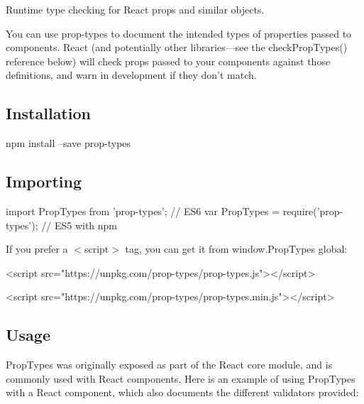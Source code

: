Runtime type checking for React props and similar objects.

You can use prop-\/types to document the intended types of properties passed to components. React (and potentially other libraries—see the check\+Prop\+Types() reference below) will check props passed to your components against those definitions, and warn in development if they don’t match.

\subsection*{Installation}


\begin{DoxyCode}
npm install --save prop-types
\end{DoxyCode}


\subsection*{Importing}


\begin{DoxyCode}
import PropTypes from 'prop-types'; // ES6
var PropTypes = require('prop-types'); // ES5 with npm
\end{DoxyCode}


If you prefer a {\ttfamily $<$script$>$} tag, you can get it from {\ttfamily window.\+Prop\+Types} global\+:


\begin{DoxyCode}
<script src="https://unpkg.com/prop-types/prop-types.js"></script>


<script src="https://unpkg.com/prop-types/prop-types.min.js"></script>
\end{DoxyCode}


\subsection*{Usage}

Prop\+Types was originally exposed as part of the React core module, and is commonly used with React components. Here is an example of using Prop\+Types with a React component, which also documents the different validators provided\+:


